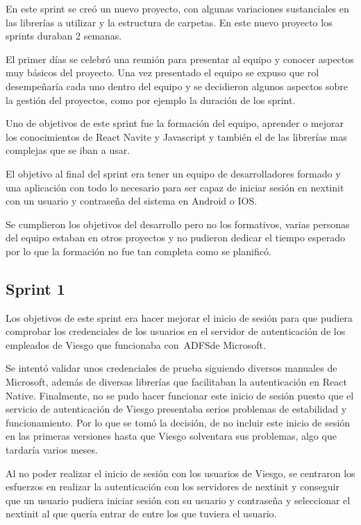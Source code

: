 En este sprint se creó un nuevo proyecto, con algunas variaciones sustanciales en las librerías a 
utilizar y la estructura de carpetas. En este nuevo proyecto los sprints duraban 2 semanas. 

El primer 
días se celebró una reunión para presentar al equipo y conocer aspectos muy básicos del proyecto. Una 
vez presentado el equipo se expuso que rol desempeñaría cada uno dentro del equipo y se decidieron 
algunos aspectos sobre la gestión del proyectos, como por ejemplo la duración de los sprint.

Uno de objetivos de este sprint fue la formación del equipo, aprender o mejorar los conocimientos de 
React Navite y Javascript y también el de las librerías mas complejas que se iban a usar.

El objetivo al final del sprint era tener un equipo de desarrolladores formado y una aplicación 
con todo lo necesario para ser 
capaz de iniciar sesión en nextinit con un usuario y contraseña del sistema en Android o IOS.

Se cumplieron los objetivos del desarrollo pero no los formativos, varias personas del equipo estaban 
en otros proyectos y no pudieron dedicar el tiempo esperado por lo que la formación no fue tan completa 
como se planificó.

\subsection{Sprint 1}

Los objetivos de este sprint era hacer mejorar el inicio de sesión para que pudiera comprobar los credenciales de los
usuarios en el servidor de autenticación de los empleados de Viesgo que funcionaba con~\acf{ADFS}de Microsoft.

Se intentó validar unos credenciales de prueba siguiendo diversos manuales de Microsoft, además de 
diversas librerías que facilitaban la autenticación en React Native. Finalmente, no se pudo hacer funcionar
 este inicio de sesión puesto que el servicio de autenticación de Viesgo presentaba serios problemas de
 estabilidad y funcionamiento. Por lo que se tomó la decisión, de no incluir este inicio de sesión en las 
 primeras versiones hasta que Viesgo solventara sus problemas, algo que tardaría varios meses.

Al no poder realizar el inicio de sesión con los usuarios de Viesgo, se centraron los esfuerzos en realizar
la autenticación con los servidores de nextinit y conseguir que un usuario pudiera iniciar sesión con su 
usuario y contraseña y seleccionar el nextinit al que quería entrar de entre los que tuviera el usuario.

